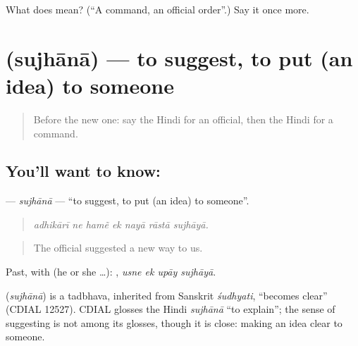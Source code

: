\begin{tcolorbox}[breakable,colback=teal!4,colframe=teal!35!black,title={Before you move on}]
What does  mean? (\textquotedblleft{}A command, an official order\textquotedblright{}.) Say it once more.
\end{tcolorbox}
\section[\texorpdfstring{\hi{सुझाना} (sujhānā)}{सुझाना (sujhānā)}]{ (sujhānā) — to suggest, to put (an idea) to someone}

\label{lesson:HI-C355-sujhana}



\begin{quote}
Before the new one: say the Hindi for an official, then the Hindi for a command.
\end{quote}

\subsection*{You'll want to know: }
\textbf{} — \emph{sujhānā} — \textquotedblleft{}to suggest, to put (an idea) to someone\textquotedblright{}.

\begin{quote}
      
\end{quote}

\begin{quote}
\emph{adhikārī ne hamẽ ek nayā rāstā sujhāyā.}
\end{quote}

\begin{quote}
The official suggested a new way to us.
\end{quote}

Past, with  (he or she …):    , \emph{usne ek upāy sujhāyā}.

\begin{cousinweb}
\textbf{} (\emph{sujhānā}) is a tadbhava, inherited from Sanskrit \emph{śudhyati}, \textquotedblleft{}becomes clear\textquotedblright{} (CDIAL 12527). CDIAL glosses the Hindi \emph{sujhānā} \textquotedblleft{}to explain\textquotedblright{}; the sense of suggesting is not among its glosses, though it is close: making an idea clear to someone.
\end{cousinweb}

